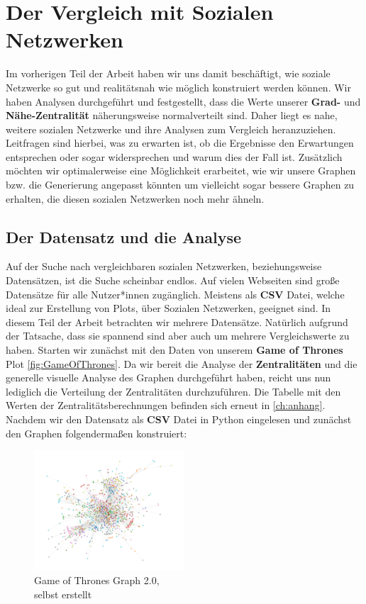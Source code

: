 \chapter{Der Vergleich mit Sozialen Netzwerken}\label{ch:vergleich}

Im vorherigen Teil der Arbeit haben wir uns damit beschäftigt, wie soziale Netzwerke so gut und realitätsnah wie möglich konstruiert werden können. Wir haben Analysen durchgeführt und festgestellt, dass die Werte unserer \textbf{Grad-} und \textbf{Nähe-Zentralität} näherungsweise normalverteilt sind. Daher liegt es nahe, weitere sozialen Netzwerke und ihre Analysen zum Vergleich heranzuziehen. Leitfragen sind hierbei, was zu erwarten ist, ob die Ergebnisse den Erwartungen entsprechen oder sogar widersprechen und warum dies der Fall ist. Zusätzlich möchten wir optimalerweise eine Möglichkeit erarbeitet, wie wir unsere Graphen bzw. die Generierung angepasst könnten um vielleicht sogar bessere Graphen zu erhalten, die diesen sozialen Netzwerken noch mehr ähneln. 

\section{Der Datensatz und die Analyse}
Auf der Suche nach vergleichbaren sozialen Netzwerken, beziehungsweise Datensätzen, ist die Suche scheinbar endlos. Auf vielen Webseiten sind große Datensätze für alle Nutzer*innen zugänglich. Meistens als \textbf{CSV} Datei, welche ideal zur Erstellung von Plots, über Sozialen Netzwerken, geeignet sind. In diesem Teil der Arbeit betrachten wir mehrere Datensätze. Natürlich aufgrund der Tatsache, dass sie spannend sind aber auch um mehrere Vergleichswerte zu haben. Starten wir zunächst mit den Daten \cite{GOT} von unserem \textbf{Game of Thrones} Plot \ref{fig:GameOfThrones}. Da wir bereit die Analyse der \textbf{Zentralitäten} und die generelle visuelle Analyse des Graphen durchgeführt haben, reicht uns nun lediglich die Verteilung der Zentralitäten durchzuführen. Die Tabelle mit den Werten der Zentralitätsberechnungen befinden sich erneut in \ref{ch:anhang}. Nachdem wir den Datensatz als \textbf{CSV} Datei in Python eingelesen und zunächst den Graphen folgendermaßen konstruiert:

\FloatBarrier
\begin{figure}[h!]%
  \centering
  \includegraphics[width=0.5\textwidth]{Graphics/GOTPlot.png}
  \caption{Game of Thrones Graph 2.0, \\
  selbst erstellt}
  \label{fig:GOT2.0}
\end{figure}
\FloatBarrier

